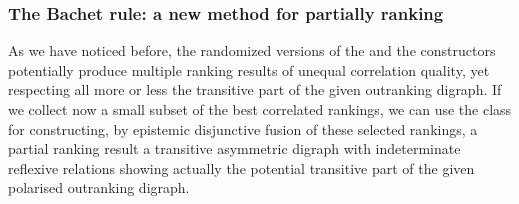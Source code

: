 \documentclass[a4paper,12pt,english]{sphinxhowto}
\begin{document}
\subsubsection{The Bachet rule: a new method for partially ranking}
\label{\detokenize{pearls:the-bachet-rule-a-new-method-for-partially-ranking}}
\sphinxAtStartPar
As we have noticed before, the randomized versions of the  and the  constructors potentially produce multiple ranking results of unequal correlation quality, yet respecting all more or less the transitive part of the given outranking digraph. If we collect now a small subset of the best correlated rankings, we can use the  class for constructing, by epistemic disjunctive fusion of these selected rankings, a partial  ranking result \textendash{}a transitive asymmetric digraph with indeterminate reflexive relations\textendash{} showing actually the potential transitive part of the given polarised outranking digraph.
\end{document}
